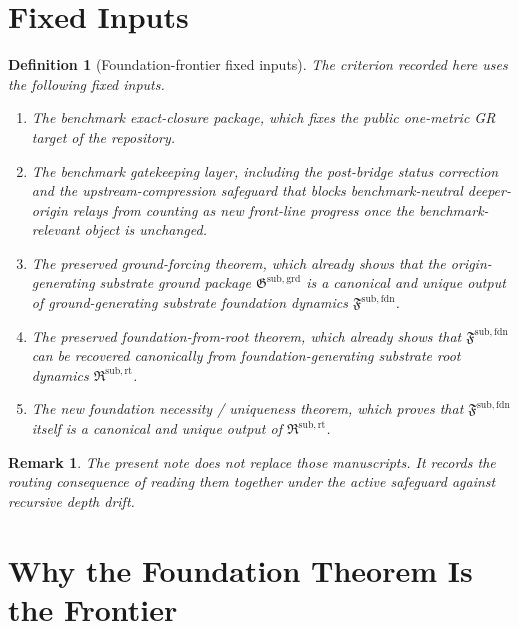 \documentclass[11pt]{article}
\newcommand{\GroundPackage}{\mathfrak G^{\mathrm{sub,grd}}}
\newcommand{\FoundationPackage}{\mathfrak F^{\mathrm{sub,fdn}}}
\newcommand{\RootPackage}{\mathfrak R^{\mathrm{sub,rt}}}
\newtheorem{definition}{Definition}
\newtheorem{remark}{Remark}
\begin{document}
\section{Fixed Inputs}

\begin{definition}[Foundation-frontier fixed inputs]
The criterion recorded here uses the following fixed inputs.
\begin{enumerate}
    \item The benchmark exact-closure package, which fixes the public one-metric GR target of the repository.
    \item The benchmark gatekeeping layer, including the post-bridge status correction and the upstream-compression safeguard that blocks benchmark-neutral deeper-origin relays from counting as new front-line progress once the benchmark-relevant object is unchanged.
    \item The preserved ground-forcing theorem, which already shows that the origin-generating substrate ground package \(\GroundPackage\) is a canonical and unique output of ground-generating substrate foundation dynamics \(\FoundationPackage\).
    \item The preserved foundation-from-root theorem, which already shows that \(\FoundationPackage\) can be recovered canonically from foundation-generating substrate root dynamics \(\RootPackage\).
    \item The new foundation necessity / uniqueness theorem, which proves that \(\FoundationPackage\) itself is a canonical and unique output of \(\RootPackage\).
\end{enumerate}
\end{definition}

\begin{remark}
The present note does not replace those manuscripts. It records the routing consequence of reading them together under the active safeguard against recursive depth drift.
\end{remark}

\section{Why the Foundation Theorem Is the Frontier}
\end{document}

